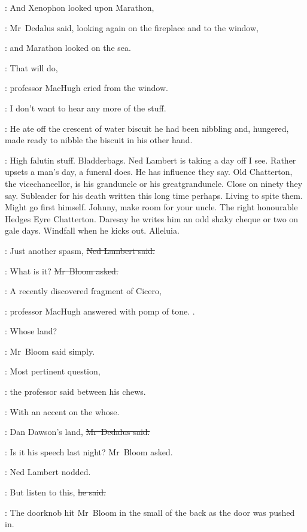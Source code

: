 \simon:
And Xenophon looked upon Marathon,

:
Mr~Dedalus said,
looking again on the fireplace and to the window,

\simon:
and Marathon looked on the sea.

\machugh:
That will do,

:
professor MacHugh cried from the window.

\machugh:
I don't want to hear any more of the stuff.

:
He ate off the crescent of water biscuit
he had been nibbling
and, hungered,
made ready to nibble the biscuit in his other hand.

\BloomInt:
High falutin stuff.
Bladderbags.
Ned Lambert is taking a day off I see.
Rather upsets a man's day, a funeral does.
He has influence they say.
Old Chatterton, the vicechancellor, is his granduncle or his greatgranduncle.
Close on ninety they say.
Subleader for his death written this long time perhaps.
Living to spite them.
Might go first himself.
Johnny, make room for your uncle.
The right honourable Hedges Eyre Chatterton.
Daresay he writes him an odd shaky cheque or two on gale days.
Windfall when he kicks out. Alleluia.

\lambert:
Just another spasm,
\sout{Ned Lambert said.}

\Bloom:
What is it?
\sout{Mr~Bloom asked.}

\machugh:
A recently discovered fragment of Cicero,

:
professor MacHugh answered
with pomp of tone.
.



\Bloom:
Whose land?

:
Mr~Bloom said simply.

\machugh:
Most pertinent question,

:
the professor said between his chews.

\machugh:
With an accent on the whose.

\simon:
Dan Dawson's land,
\sout{Mr~Dedalus said.}

\Bloom:
Is it his speech last night?
Mr~Bloom asked.

:
Ned Lambert nodded.

\lambert:
But listen to this,
\sout{he said.}

:
The doorknob hit Mr~Bloom in the small of the back
as the door was pushed in.

